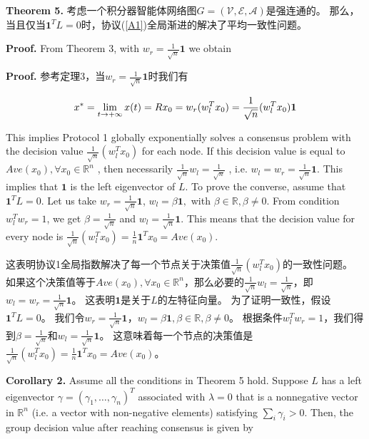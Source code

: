 \documentclass{article}
\begin{document}
\noindent \textbf{Theorem 5.} 考虑一个积分器智能体网络图$G=(\mathcal{V}, \mathcal{E}, \mathcal{A})$是强连通的。
那么，当且仅当$\mathbf{1}^TL=0$时，协议(\ref{A1})全局渐进的解决了平均一致性问题。

{\color[gray]{0.5}
\noindent \textbf{Proof.} From Theorem 3, with $w_r = \frac{1}{\sqrt{n}}\mathbf{1}$ we obtain 
}

\noindent \textbf{Proof.} 参考定理3，当$w_r = \frac{1}{\sqrt{n}}\mathbf{1}$时我们有

\begin{equation}
    x^* = \lim_{t\rightarrow +\infty}x(t) = Rx_0 = w_r(w_l^T x_0) = \frac{1}{\sqrt{n}}(w_l^Tx_0)\mathbf{1}
    \notag
\end{equation}

{\color[gray]{0.5}
\noindent This implies Protocol 1 globally exponentially solves a consensus problem with the decision value $\frac{1}{\sqrt{n}}(w_l^Tx_0)$ for each node. 
If this decision value is equal to $Ave(x_0), \forall x_0 \in \mathbb{R}^n$ , then necessarily $\frac{1}{\sqrt{n}}w_l = \frac{1}{\sqrt{n}}$ , i.e. $w_l= w_r=\frac{1}{\sqrt{n}}\mathbf{1}$. 
This implies that $\mathbf{1}$ is the left eigenvector of $L$. 
To prove the converse, assume that $\mathbf{1}^TL=0$. 
Let us take $w_r=\frac{1}{\sqrt{n}}\mathbf{1}$, $w_l=\beta\mathbf{1},$ with $\beta\in\mathbb{R},\beta\ne0$. 
From condition $w_l^Tw_r=1$, we get $\beta=\frac{1}{\sqrt{n}}$ and $w_l=\frac{1}{\sqrt{n}}\mathbf{1}$. 
This means that the decision value for every node is $\frac{1}{\sqrt{n}}(w_l^Tx_0)=\frac{1}{n}\mathbf{1}^Tx_0=Ave(x_0)$.
}

\noindent 这表明协议1全局指数解决了每一个节点关于决策值$\frac{1}{\sqrt{n}}(w_l^Tx_0)$的一致性问题。
如果这个决策值等于$Ave(x_0), \forall x_0 \in \mathbb{R}^n$，那么必要的$\frac{1}{\sqrt{n}}w_l = \frac{1}{\sqrt{n}}$，即$w_l= w_r=\frac{1}{\sqrt{n}}\mathbf{1}$。
这表明$\mathbf{1}$是关于$L$的左特征向量。
为了证明一致性，假设$\mathbf{1}^TL=0$。
我们令$w_r=\frac{1}{\sqrt{n}}\mathbf{1}$，$w_l=\beta\mathbf{1},\beta\in\mathbb{R},\beta\ne0$。
根据条件$w_l^Tw_r=1$，我们得到$\beta=\frac{1}{\sqrt{n}}$和$w_l=\frac{1}{\sqrt{n}}\mathbf{1}$。
这意味着每一个节点的决策值是$\frac{1}{\sqrt{n}}(w_l^Tx_0)=\frac{1}{n}\mathbf{1}^Tx_0=Ave(x_0)$。

{\color[gray]{0.5}
\noindent \textbf{Corollary 2.} Assume all the conditions in Theorem 5 hold. 
Suppose $L$ has a left eigenvector $\gamma = (\gamma_1, \dots, \gamma_n)^T$ associated with $\lambda=0$ that is a nonnegative vector in $\mathbb{R}^n$ (i.e. a vector with non-negative elements) satisfying $\sum_i\gamma_i>0$. 
Then, the group decision value after reaching consensus is given by
}
\end{document}
